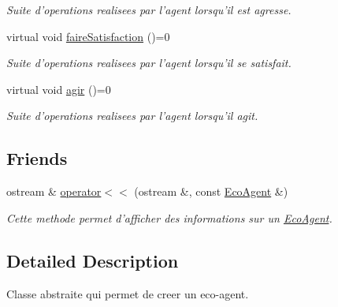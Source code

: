 \begin{CompactItemize}
\begin{CompactList}\small\item\em Suite d'operations realisees par l'agent lorsqu'il est agresse. \item\end{CompactList}\item 
\hypertarget{classEcoAgent_ab76d1cc6f418192d90fc42c2fc4d8ac}{
virtual void \hyperlink{classEcoAgent_ab76d1cc6f418192d90fc42c2fc4d8ac}{faireSatisfaction} ()=0}
\label{classEcoAgent_ab76d1cc6f418192d90fc42c2fc4d8ac}

\begin{CompactList}\small\item\em Suite d'operations realisees par l'agent lorsqu'il se satisfait. \item\end{CompactList}\item 
\hypertarget{classEcoAgent_ec8ff50dddde6ad423ee13ee602adcaf}{
virtual void \hyperlink{classEcoAgent_ec8ff50dddde6ad423ee13ee602adcaf}{agir} ()=0}
\label{classEcoAgent_ec8ff50dddde6ad423ee13ee602adcaf}

\begin{CompactList}\small\item\em Suite d'operations realisees par l'agent lorsqu'il agit. \item\end{CompactList}\end{CompactItemize}
\subsection*{Friends}
\begin{CompactItemize}
\item 
\hypertarget{classEcoAgent_fbb4d338d8cc27e755b4d5b2a8c52d68}{
ostream \& \hyperlink{classEcoAgent_fbb4d338d8cc27e755b4d5b2a8c52d68}{operator$<$$<$} (ostream \&, const \hyperlink{classEcoAgent}{EcoAgent} \&)}
\label{classEcoAgent_fbb4d338d8cc27e755b4d5b2a8c52d68}

\begin{CompactList}\small\item\em Cette methode permet d'afficher des informations sur un \hyperlink{classEcoAgent}{EcoAgent}. \item\end{CompactList}\end{CompactItemize}


\subsection{Detailed Description}
Classe abstraite qui permet de creer un eco-agent. 

